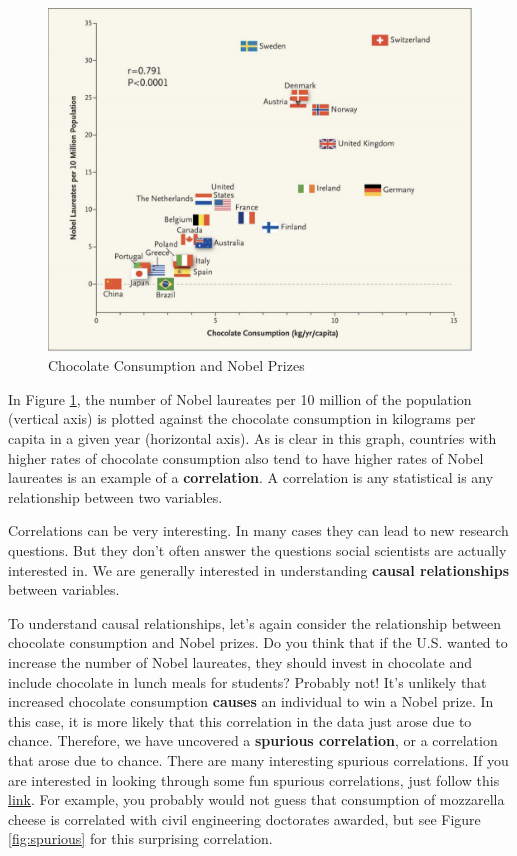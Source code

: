 \documentclass[
]{book}
\begin{document}
\begin{figure}

{\centering \includegraphics[width=0.75\linewidth]{images/01_chocolate} 

}

\caption{Chocolate Consumption and Nobel Prizes}\label{fig:chocolate}
\end{figure}

In Figure \ref{fig:chocolate}, the number of Nobel laureates per 10 million of the population (vertical axis) is plotted against the chocolate consumption in kilograms per capita in a given year (horizontal axis). As is clear in this graph, countries with higher rates of chocolate consumption also tend to have higher rates of Nobel laureates is an example of a \textbf{correlation}. A correlation is any statistical is any relationship between two variables.

Correlations can be very interesting. In many cases they can lead to new research questions. But they don't often answer the questions social scientists are actually interested in. We are generally interested in understanding \textbf{causal relationships} between variables.

To understand causal relationships, let's again consider the relationship between chocolate consumption and Nobel prizes. Do you think that if the U.S. wanted to increase the number of Nobel laureates, they should invest in chocolate and include chocolate in lunch meals for students? Probably not! It's unlikely that increased chocolate consumption \textbf{causes} an individual to win a Nobel prize. In this case, it is more likely that this correlation in the data just arose due to chance. Therefore, we have uncovered a \textbf{spurious correlation}, or a correlation that arose due to chance. There are many interesting spurious correlations. If you are interested in looking through some fun spurious correlations, just follow this \href{https://www.tylervigen.com/spurious-correlations}{link}. For example, you probably would not guess that consumption of mozzarella cheese is correlated with civil engineering doctorates awarded, but see Figure \ref{fig:spurious} for this surprising correlation.
\end{document}
